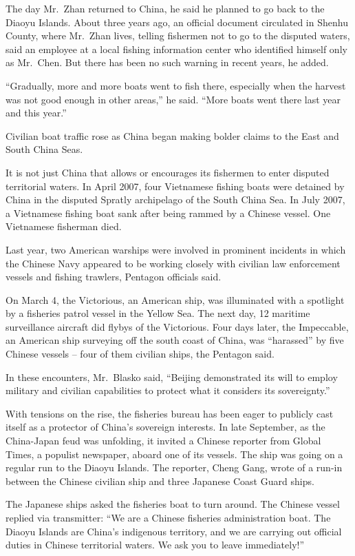 ﻿\documentclass[12pt]{article}
\begin{document}
The day Mr.~Zhan returned to China, he said he planned to go back to the Diaoyu Islands. About three
years ago, an official document circulated in Shenhu County, where Mr.~Zhan lives, telling fishermen
not to go to the disputed waters, said an employee at a local fishing information center who
identified himself only as Mr.~Chen. But there has been no such warning in recent years, he added.

``Gradually, more and more boats went to fish there, especially when the harvest was not good enough
in other areas,'' he said. ``More boats went there last year and this year.''

Civilian boat traffic rose as China began making bolder claims to the East and South China Seas.

It is not just China that allows or encourages its fishermen to enter disputed territorial waters.
In April 2007, four Vietnamese fishing boats were detained by China in the disputed Spratly
archipelago of the South China Sea. In July 2007, a Vietnamese fishing boat sank after being rammed
by a Chinese vessel. One Vietnamese fisherman died.

Last year, two American warships were involved in prominent incidents in which the Chinese Navy
appeared to be working closely with civilian law enforcement vessels and fishing trawlers, Pentagon
officials said.

On March 4, the Victorious, an American ship, was illuminated with a spotlight by a fisheries patrol
vessel in the Yellow Sea. The next day, 12 maritime surveillance aircraft did flybys of the
Victorious. Four days later, the Impeccable, an American ship surveying off the south coast of
China, was ``harassed'' by five Chinese vessels -- four of them civilian ships, the Pentagon said.

In these encounters, Mr.~Blasko said, ``Beijing demonstrated its will to employ military and
civilian capabilities to protect what it considers its sovereignty.''

With tensions on the rise, the fisheries bureau has been eager to publicly cast itself as a
protector of China's sovereign interests. In late September, as the China-Japan feud was unfolding,
it invited a Chinese reporter from Global Times, a populist newspaper, aboard one of its vessels.
The ship was going on a regular run to the Diaoyu Islands. The reporter, Cheng Gang, wrote of a
run-in between the Chinese civilian ship and three Japanese Coast Guard ships.

The Japanese ships asked the fisheries boat to turn around. The Chinese vessel replied via
transmitter: ``We are a Chinese fisheries administration boat. The Diaoyu Islands are China's
indigenous territory, and we are carrying out official duties in Chinese territorial waters. We ask
you to leave immediately!''
\end{document}
